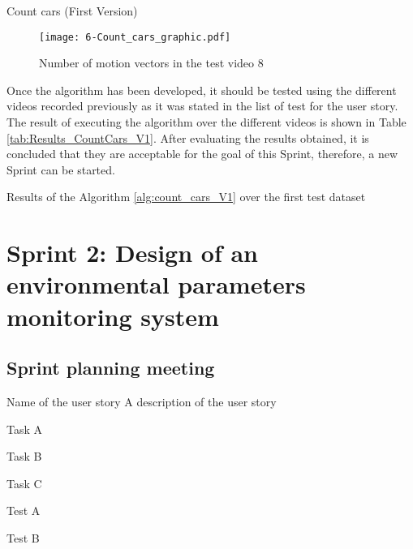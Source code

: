 \begin{algorithm}
{{{			}
		}	
	}
	\caption{Count cars (First Version)}\label{alg:count_cars_V1}
\end{algorithm}\DecMargin{1em}

\begin{figure}[!h]
	\begin{center}
		\texttt{[image: 6-Count\_cars\_graphic.pdf]}
		\caption{Number of motion vectors in the test video 8}
		\label{fig:6-Count_cars_graphic}
	\end{center}
\end{figure}

Once the algorithm has been developed, it should be tested using the different videos recorded previously as it was stated in the list of test for the user story. The result of executing the algorithm over the different videos is shown in Table \ref{tab:Results_CountCars_V1}. After evaluating the results obtained, it is concluded that they are acceptable for the goal of this Sprint, therefore, a new Sprint can be started.

\begin{table}[hp]
	\centering
	{\small
		
	}
	\caption{Results of the Algorithm \ref{alg:count_cars_V1} over the first test dataset}
	\label{tab:Results_CountCars_V1}
\end{table}






\section{Sprint 2: Design of an environmental parameters monitoring system}

\subsection{Sprint planning meeting}

{Name of the user story}
{A description of the user story}
{	\item Task A
	\item Task B
	\item Task C
}{	\item Test A
	\item Test B
}


